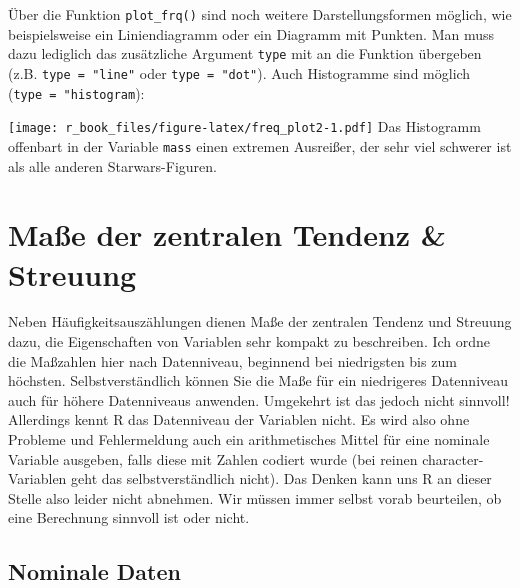 \documentclass[
]{book}
\newenvironment{Shaded}{\begin{snugshade}}{\end{snugshade}}
\newcommand{\AttributeTok}[1]{\textcolor[rgb]{0.77,0.63,0.00}{#1}}
\newcommand{\FunctionTok}[1]{\textcolor[rgb]{0.00,0.00,0.00}{#1}}
\newcommand{\NormalTok}[1]{#1}
\newcommand{\SpecialCharTok}[1]{\textcolor[rgb]{0.00,0.00,0.00}{#1}}
\newcommand{\StringTok}[1]{\textcolor[rgb]{0.31,0.60,0.02}{#1}}
\begin{document}
Über die Funktion \texttt{plot\_frq()} sind noch weitere Darstellungsformen möglich, wie beispielsweise ein Liniendiagramm oder ein Diagramm mit Punkten. Man muss dazu lediglich das zusätzliche Argument \texttt{type} mit an die Funktion übergeben (z.B. \texttt{type\ =\ "line"} oder \texttt{type\ =\ "dot"}). Auch Histogramme sind möglich (\texttt{type\ =\ "histogram}):

\begin{Shaded}
\end{Shaded}

\texttt{[image: r\_book\_files/figure-latex/freq\_plot2-1.pdf]}
Das Histogramm offenbart in der Variable \texttt{mass} einen extremen Ausreißer, der sehr viel schwerer ist als alle anderen Starwars-Figuren.

\hypertarget{mauxdfe-der-zentralen-tendenz-streuung}{%
\section{Maße der zentralen Tendenz \& Streuung}\label{mauxdfe-der-zentralen-tendenz-streuung}}

Neben Häufigkeitsauszählungen dienen Maße der zentralen Tendenz und Streuung dazu, die Eigenschaften von Variablen sehr kompakt zu beschreiben. Ich ordne die Maßzahlen hier nach Datenniveau, beginnend bei niedrigsten bis zum höchsten. Selbstverständlich können Sie die Maße für ein niedrigeres Datenniveau auch für höhere Datenniveaus anwenden. Umgekehrt ist das jedoch nicht sinnvoll! Allerdings kennt R das Datenniveau der Variablen nicht. Es wird also ohne Probleme und Fehlermeldung auch ein arithmetisches Mittel für eine nominale Variable ausgeben, falls diese mit Zahlen codiert wurde (bei reinen character-Variablen geht das selbstverständlich nicht). Das Denken kann uns R an dieser Stelle also leider nicht abnehmen. Wir müssen immer selbst vorab beurteilen, ob eine Berechnung sinnvoll ist oder nicht.

\hypertarget{nominale-daten}{%
\subsection{Nominale Daten}\label{nominale-daten}}
\end{document}
